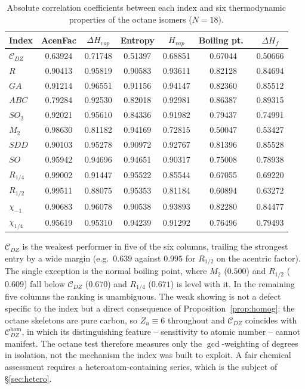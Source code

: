\documentclass[11pt,a4paper]{article}
\theoremstyle{plain}
\theoremstyle{definition}
\theoremstyle{remark}
\newcommand{\CDZ}{\mathcal{C}_{DZ}}
\newcommand{\CDZhom}{\mathcal{C}_{DZ}^{\mathrm{hom}}}
\newcommand{\gcdd}{\operatorname{gcd}}
\begin{document}
\begin{table}[htbp]
\centering
\small
\setlength{\tabcolsep}{5pt}
\caption{Absolute correlation coefficients between each index and six
thermodynamic properties of the octane isomers ($N=18$).}
\label{tab:octane}
\begin{tabular}{lcccccc}
\toprule
Index & AcenFac & $\Delta H_{vap}$ & Entropy & $H_{vap}$ & Boiling pt.\ & $\Delta H_f$ \\
\midrule
$\CDZ$       & 0.63924 & 0.71748 & 0.51397 & 0.68851 & 0.67044 & 0.50666 \\
$R$          & 0.90413 & 0.95819 & 0.90583 & 0.93611 & 0.82128 & 0.84694 \\
$GA$         & 0.91214 & 0.96551 & 0.91156 & 0.94147 & 0.82360 & 0.85512 \\
$ABC$        & 0.79284 & 0.92530 & 0.82018 & 0.92981 & 0.86387 & 0.89315 \\
$SO_2$       & 0.92021 & 0.95610 & 0.84336 & 0.91982 & 0.79437 & 0.74991 \\
$M_2$        & 0.98630 & 0.81182 & 0.94169 & 0.72815 & 0.50047 & 0.53427 \\
$SDD$        & 0.90103 & 0.95278 & 0.90972 & 0.92767 & 0.81396 & 0.85528 \\
$SO$         & 0.95942 & 0.94696 & 0.94651 & 0.90317 & 0.75008 & 0.78938 \\
$R_{1/4}$    & 0.99002 & 0.91447 & 0.95522 & 0.85544 & 0.67055 & 0.69220 \\
$R_{1/2}$    & 0.99511 & 0.88075 & 0.95353 & 0.81184 & 0.60894 & 0.63272 \\
$\chi_{-1}$  & 0.90683 & 0.96078 & 0.90538 & 0.93893 & 0.82280 & 0.84477 \\
$\chi_{1/4}$ & 0.95619 & 0.95310 & 0.94239 & 0.91292 & 0.76496 & 0.79493 \\
\bottomrule
\end{tabular}
\end{table}

$\CDZ$ is the weakest performer in five of the six columns, trailing the
strongest entry by a wide margin (e.g.\ $0.639$ against $0.995$ for $R_{1/2}$ on
the acentric factor). The single exception is the normal boiling point, where
$M_2$ ($0.500$) and $R_{1/2}$ ($0.609$) fall below $\CDZ$ ($0.670$) and
$R_{1/4}$ ($0.671$) is level with it. In the remaining five columns the ranking
is unambiguous. The weak showing is not a defect specific to the index but a
direct consequence of
Proposition~\ref{prop:homog}: the octane skeletons are pure carbon, so
$Z_u\equiv6$ throughout and $\CDZ$ coincides with $\CDZhom$, in which its
distinguishing feature -- sensitivity to atomic number -- cannot manifest. The
octane test therefore measures only the $\gcdd$-weighting of degrees in
isolation, not the mechanism the index was built to exploit. A fair chemical
assessment requires a heteroatom-containing series, which is the subject of
\S\ref{sec:hetero}.
\end{document}
